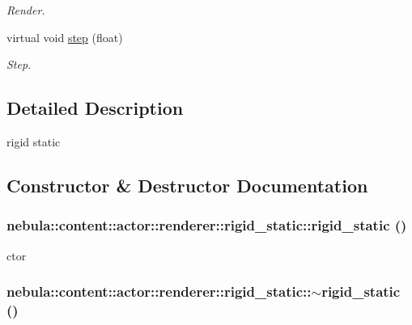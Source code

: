\begin{DoxyCompactItemize}
\begin{DoxyCompactList}\small\item\em Render. \item\end{DoxyCompactList}\item 
virtual void \hyperlink{classnebula_1_1content_1_1actor_1_1renderer_1_1rigid__static_a1423732157573e9276023a54471b3f3a}{step} (float)
\begin{DoxyCompactList}\small\item\em Step. \item\end{DoxyCompactList}\end{DoxyCompactItemize}


\subsection{Detailed Description}
rigid static 

\subsection{Constructor \& Destructor Documentation}
\hypertarget{classnebula_1_1content_1_1actor_1_1renderer_1_1rigid__static_af9913521660485e45402f560abdfcd9c}{
\subsubsection[{rigid\_\-static}]{\setlength{\rightskip}{0pt plus 5cm}nebula::content::actor::renderer::rigid\_\-static::rigid\_\-static ()}}
\label{classnebula_1_1content_1_1actor_1_1renderer_1_1rigid__static_af9913521660485e45402f560abdfcd9c}


ctor \hypertarget{classnebula_1_1content_1_1actor_1_1renderer_1_1rigid__static_a41e03f82006610a7b19cdd7901999e67}{
\subsubsection[{$\sim$rigid\_\-static}]{\setlength{\rightskip}{0pt plus 5cm}nebula::content::actor::renderer::rigid\_\-static::$\sim$rigid\_\-static ()}}
\label{classnebula_1_1content_1_1actor_1_1renderer_1_1rigid__static_a41e03f82006610a7b19cdd7901999e67}


